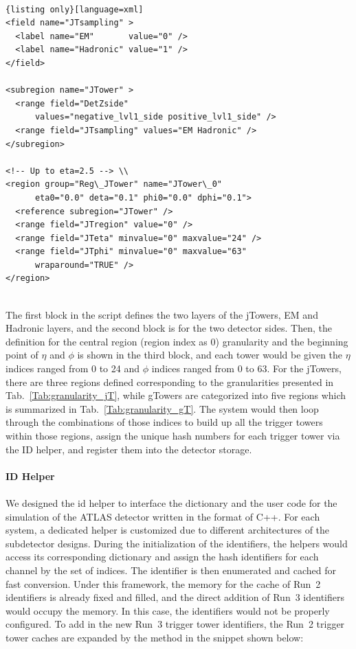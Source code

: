 \\
\begin{lstlisting}{listing only}[language=xml]
<field name="JTsampling" > 
  <label name="EM"       value="0" /> 
  <label name="Hadronic" value="1" /> 
</field> 
	
<subregion name="JTower" > 
  <range field="DetZside"
      values="negative_lvl1_side positive_lvl1_side" /> 
  <range field="JTsampling" values="EM Hadronic" /> 
</subregion> 
	
<!-- Up to eta=2.5 --> \\
<region group="Reg\_JTower" name="JTower\_0" 
      eta0="0.0" deta="0.1" phi0="0.0" dphi="0.1"> 
  <reference subregion="JTower" /> 
  <range field="JTregion" value="0" /> 
  <range field="JTeta" minvalue="0" maxvalue="24" />
  <range field="JTphi" minvalue="0" maxvalue="63" 
      wraparound="TRUE" /> 
</region>
	
\end{lstlisting}
\noindent
The first block in the script defines the two layers of the jTowers, EM and Hadronic layers, and the second block is for the two detector sides. Then, the definition for the central region (region index as 0) granularity and the beginning point of $\eta$ and $\phi$ is shown in the third block, and each tower would be given the $\eta$ indices ranged from 0 to 24 and $\phi$ indices ranged from 0 to 63. For the jTowers, there are three regions defined corresponding to the granularities presented in Tab.~\ref{Tab:granularity_jT}, while gTowers are categorized into five regions which is summarized in Tab.~\ref{Tab:granularity_gT}. The system would then loop through the combinations of those indices to build up all the trigger towers within those regions, assign the unique hash numbers for each trigger tower via the ID helper, and register them into the detector storage\cite{Calafiura:2003gf}.
\\
\\{\bf ID Helper}
\\
\\We designed the id helper to interface the dictionary and the user code for the simulation of the ATLAS detector written in the format of C++. For each system, a dedicated helper is customized due to different architectures of the subdetector designs. During the initialization of the identifiers, the helpers would access its corresponding dictionary and assign the hash identifiers for each channel by the set of indices. The identifier is then enumerated and cached for fast conversion. Under this framework, the memory for the cache of Run~2 identifiers is already fixed and filled, and the direct addition of Run~3 identifiers would occupy the memory. In this case, the identifiers would not be properly configured. To add in the new Run~3 trigger tower identifiers, the Run~2 trigger tower caches are expanded by the method in the snippet shown below:
